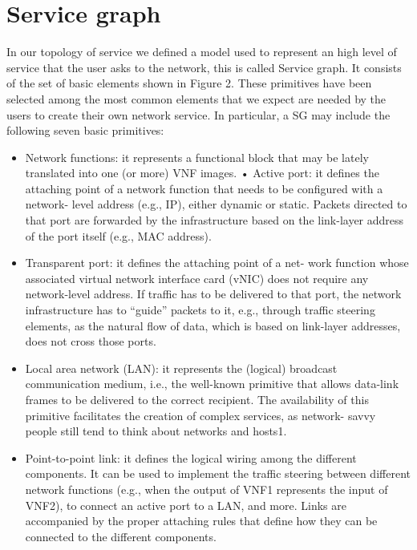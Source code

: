\chapter{Service graph}

In our topology of service we defined a model used to represent an high level of service that the user asks to the network, this is called Service graph. It consists of the set of basic elements shown in Figure 2. These primitives have been selected among the most common elements that we expect are needed by the users to create their own network service.
In particular, a SG may include the following seven basic primitives:
\begin{itemize}

	\item Network functions: it represents a functional block that may be lately translated into one (or more) VNF images. • Active port: it defines the attaching point of a network function that needs to be configured with a network- level address (e.g., IP), either dynamic or static. Packets
	directed to that port are forwarded by the infrastructure based on the link-layer address of the port itself (e.g., MAC address).

	\item Transparent port: it defines the attaching point of a net- work function whose associated virtual network interface card (vNIC) does not require any network-level address. If traffic has to be delivered to that port, the network infrastructure has to “guide” packets to it, e.g., through traffic steering elements, as the natural flow of data, which is based on link-layer addresses, does not cross those ports.
	
	\item Local area network (LAN): it represents the (logical) broadcast communication medium, i.e., the well-known primitive that allows data-link frames to be delivered to the correct recipient. The availability of this primitive facilitates the creation of complex services, as network- savvy people still tend to think about networks and hosts1.
	
	\item Point-to-point link: it defines the logical wiring among the different components. It can be used to implement the traffic steering between different network functions (e.g., when the output of VNF1 represents the input of VNF2), to connect an active port to a LAN, and more. Links are accompanied by the proper attaching rules that define how they can be connected to the different components.
	

\end{itemize}
